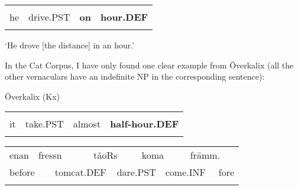 \begin{tabular}{llll}
\lsptoprule
\multicolumn{4}{l}{Han

}\\
he & drive.PST & {\bfseries on} & {\bfseries hour.DEF}\\
\lspbottomrule
\end{tabular}

\begin{styleTranslation}
‘He drove [the distance] in an hour.’

\end{styleTranslation}

In the Cat Corpus, I have only found one clear example from Överkalix (all the other vernaculars have an indefinite NP in the corresponding sentence):


\begin{listWWNumileveli}
\item {}

\begin{styleExample}
Överkalix (Kx) 

\end{styleExample}

\end{listWWNumileveli}

\begin{tabular}{llll}
\lsptoprule
\multicolumn{4}{l}{He

}\\
it & take.PST & almost & {\bfseries half-hour.DEF}\\
\lspbottomrule
\end{tabular}

\begin{tabular}{llllllllll}
\lsptoprule
enan & \multicolumn{2}{l}{fressn

} & \multicolumn{2}{l}{tåoRs

} & \multicolumn{2}{l}{koma

} & \multicolumn{2}{l}{främm.

} & \\
\multicolumn{2}{l}{before

} & \multicolumn{2}{l}{tomcat.DEF

} & \multicolumn{2}{l}{dare.PST

} & \multicolumn{2}{l}{come.INF

} & \multicolumn{2}{l}{fore

}\\
\lspbottomrule
\end{tabular}

